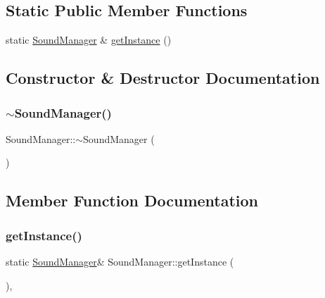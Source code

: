 \subsection*{Static Public Member Functions}
\begin{DoxyCompactItemize}
\item 
static \mbox{\hyperlink{class_sound_manager}{Sound\+Manager}} \& \mbox{\hyperlink{class_sound_manager_a4f8f0b2d539d055f4c1de8c47d483cb3}{get\+Instance}} ()
\end{DoxyCompactItemize}


\subsection{Constructor \& Destructor Documentation}
\mbox{\label{class_sound_manager_ad5dbf8eab22db48ff8f3db51b02f8938}} 
\subsubsection{\texorpdfstring{$\sim$\+Sound\+Manager()}{~SoundManager()}}
{\footnotesize\ttfamily Sound\+Manager\+::$\sim$\+Sound\+Manager (\begin{DoxyParamCaption}{ }\end{DoxyParamCaption})}



\subsection{Member Function Documentation}
\mbox{\label{class_sound_manager_a4f8f0b2d539d055f4c1de8c47d483cb3}} 
\subsubsection{\texorpdfstring{get\+Instance()}{getInstance()}}
{\footnotesize\ttfamily static \mbox{\hyperlink{class_sound_manager}{Sound\+Manager}}\& Sound\+Manager\+::get\+Instance (\begin{DoxyParamCaption}{ }\end{DoxyParamCaption})\hspace{0.3cm}{\ttfamily [inline]}, {\ttfamily [static]}}

